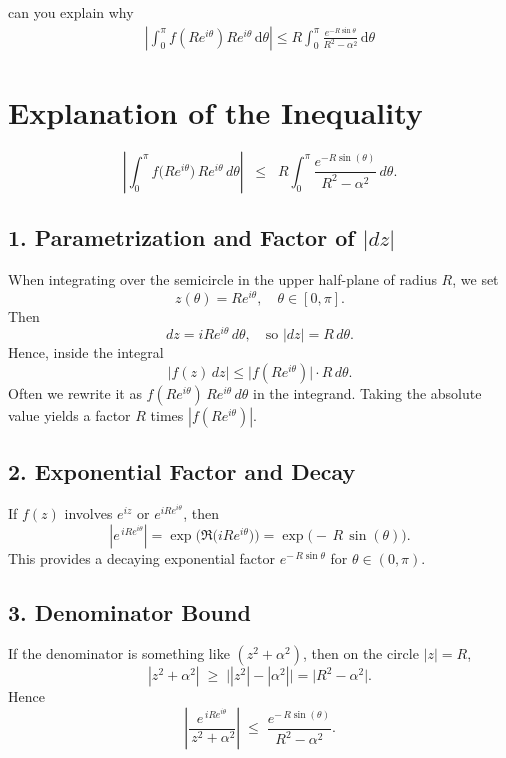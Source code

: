 \documentclass[12pt]{article}
\title{}
\author{Jerich Lee}
\date{\today}
\theoremstyle{definition} %
\theoremstyle{plain} %
\begin{document}
\maketitle
can you explain why 
\begin{align}
    \left\vert \int_{0}^{\pi}f(Re^{i \theta})Re^{i \theta}  \,\mathrm{d}\theta  \right\vert \leq R \int_{0}^{\pi}\frac{e^{-R\sin \theta}}{R^{2}-\alpha^{2}}  \,\mathrm{d}\theta 
\end{align} 

\section*{Explanation of the Inequality}
\[
\left\lvert \int_{0}^{\pi} f\bigl(Re^{i\theta}\bigr)\,Re^{i\theta}\,d\theta \right\rvert 
\;\;\le\;\;
R \int_{0}^{\pi} \frac{e^{-R\sin(\theta)}}{\,R^{2}-\alpha^{2}\,} \,d\theta.
\]

\subsection*{1. Parametrization and Factor of \(\lvert dz\rvert\)}
When integrating over the semicircle in the upper half-plane of radius $R$, we set 
\[
z(\theta) = Re^{i\theta},\quad \theta\in[0,\pi].
\]
Then 
\[
dz = iRe^{i\theta}\,d\theta,\quad \text{so } |dz| = R\,d\theta.
\]
Hence, inside the integral
\[
|f(z)\,dz| \le \bigl|f(Re^{i\theta})\bigr|\cdot R\,d\theta.
\]
Often we rewrite it as $f(Re^{i\theta})\,Re^{i\theta}\,d\theta$ in the integrand. Taking the absolute value yields a factor $R$ times $|f(Re^{i\theta})|$.

\subsection*{2. Exponential Factor and Decay}
If $f(z)$ involves $e^{iz}$ or $e^{iRe^{i\theta}}$, then
\[
\left\lvert e^{\,iRe^{i\theta}}\right\rvert 
= \exp\!\bigl(\Re\bigl(iRe^{i\theta}\bigr)\bigr)
= \exp\!\bigl(-\,R\,\sin(\theta)\bigr).
\]
This provides a decaying exponential factor $e^{-\,R\sin\theta}$ for $\theta\in(0,\pi)$.

\subsection*{3. Denominator Bound}
If the denominator is something like $(z^2+\alpha^2)$, then on the circle $|z|=R$,
\[
|z^2 + \alpha^2|
\;\ge\;
\bigl||z^2| - |\alpha^2|\bigr|
= \bigl|R^2 - \alpha^2\bigr|.
\]
Hence
\[
\left\lvert \frac{e^{\,iRe^{i\theta}}}{\,z^2 + \alpha^2}\right\rvert
\;\le\;
\frac{e^{-\,R\sin(\theta)}}{\,R^2 - \alpha^2\,}.
\]
\end{document}
